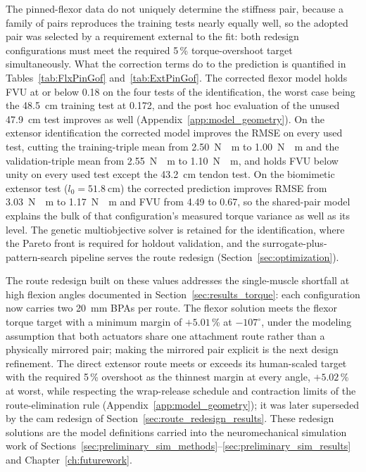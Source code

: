 \begin{table}[htbp]
\end{table} The pinned-flexor data do not uniquely determine the stiffness pair, because a family of pairs reproduces the training tests nearly equally well, so the adopted pair was selected by a requirement external to the fit: both redesign configurations must meet the required 5\,\% torque-overshoot target simultaneously. What the correction terms do to the prediction is quantified in Tables~\ref{tab:FlxPinGof} and~\ref{tab:ExtPinGof}. The corrected flexor model holds FVU at or below 0.18 on the four tests of the identification, the worst case being the \qty{48.5}{\cm} training test at 0.172, and the post hoc evaluation of the unused \qty{47.9}{\cm} test improves as well (Appendix~\ref{app:model_geometry}). On the extensor identification the corrected model improves the RMSE on every used test, cutting the training-triple mean from \qty{2.50}{\newton\cdot\meter} to \qty{1.00}{\newton\cdot\meter} and the validation-triple mean from \qty{2.55}{\newton\cdot\meter} to \qty{1.10}{\newton\cdot\meter}, and holds FVU below unity on every used test except the \qty{43.2}{\cm} tendon test. On the biomimetic extensor test ($l_{0} = \qty{51.8}{\cm}$) the corrected prediction improves RMSE from \qty{3.03}{\newton\cdot\meter} to \qty{1.17}{\newton\cdot\meter} and FVU from 4.49 to 0.67, so the shared-pair model explains the bulk of that configuration's measured torque variance as well as its level. The genetic multiobjective solver is retained for the identification, where the Pareto front is required for holdout validation, and the surrogate-plus-pattern-search pipeline serves the route redesign (Section~\ref{sec:optimization}).

The route redesign built on these values addresses the single-muscle shortfall at high flexion angles documented in Section~\ref{sec:results_torque}: each configuration now carries two \qty{20}{\mm} BPAs per route. The flexor solution meets the flexor torque target with a minimum margin of $+5.01$\,\% at $-107^{\circ}$, under the modeling assumption that both actuators share one attachment route rather than a physically mirrored pair; making the mirrored pair explicit is the next design refinement. The direct extensor route meets or exceeds its human-scaled target with the required 5\,\% overshoot as the thinnest margin at every angle, $+5.02$\,\% at worst, while respecting the wrap-release schedule and contraction limits of the route-elimination rule (Appendix~\ref{app:model_geometry}); it was later superseded by the cam redesign of Section~\ref{sec:route_redesign_results}. These redesign solutions are the model definitions carried into the neuromechanical simulation work of Sections~\ref{sec:preliminary_sim_methods}--\ref{sec:preliminary_sim_results} and Chapter~\ref{ch:futurework}.

